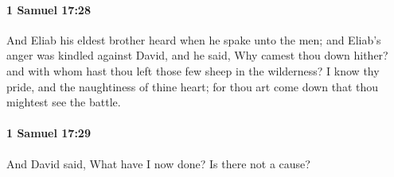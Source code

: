 		\paragraph{1 Samuel 17:28} %
			\label{1SAMUEL-17-28}

			And Eliab his eldest brother heard when he spake unto the men; and Eliab’s anger was kindled against David, and he said, Why camest thou down hither? and with whom hast thou left those few sheep in the wilderness? I know thy pride, and the naughtiness of thine heart; for thou art come down that thou mightest see the battle.


		\paragraph{1 Samuel 17:29} %
			\label{1SAMUEL-17-29}

			And David said, What have I now done? Is there not a cause?

